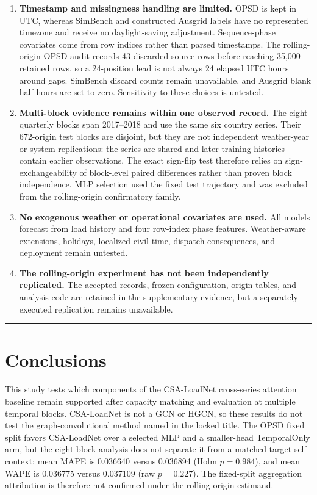 \documentclass[electronics,article,submit,moreauthors]{Definitions/mdpi}
\begin{document}
\begin{enumerate}
\item
  \textbf{Timestamp and missingness handling are limited.} OPSD is kept in UTC, whereas SimBench and constructed Ausgrid labels have no represented timezone and receive no daylight-saving adjustment. Sequence-phase covariates come from row indices rather than parsed timestamps. The rolling-origin OPSD audit records 43 discarded source rows before reaching 35,000 retained rows, so a 24-position lead is not always 24 elapsed UTC hours around gaps. SimBench discard counts remain unavailable, and Ausgrid blank half-hours are set to zero. Sensitivity to these choices is untested.
\item
  \textbf{Multi-block evidence remains within one observed record.} The eight quarterly blocks span 2017--2018 and use the same six country series. Their 672-origin test blocks are disjoint, but they are not independent weather-year or system replications: the series are shared and later training histories contain earlier observations. The exact sign-flip test therefore relies on sign-exchangeability of block-level paired differences rather than proven block independence. MLP selection used the fixed test trajectory and was excluded from the rolling-origin confirmatory family.
\item
  \textbf{No exogenous weather or operational covariates are used.} All models forecast from load history and four row-index phase features. Weather-aware extensions, holidays, localized civil time, dispatch consequences, and deployment remain untested.
\item
  \textbf{The rolling-origin experiment has not been independently replicated.} The accepted records, frozen configuration, origin tables, and analysis code are retained in the supplementary evidence, but a separately executed replication remains unavailable.
\end{enumerate}

\begin{center}\rule{0.5\linewidth}{0.5pt}\end{center}

\section{Conclusions}\label{conclusions}

This study tests which components of the CSA-LoadNet cross-series attention baseline remain supported after capacity matching and evaluation at multiple temporal blocks. CSA-LoadNet is not a GCN or HGCN, so these results do not test the graph-convolutional method named in the locked title. The OPSD fixed split favors CSA-LoadNet over a selected MLP and a smaller-head TemporalOnly arm, but the eight-block analysis does not separate it from a matched target-self context: mean MAPE is 0.036640 versus 0.036894 (Holm \(p=0.984\)), and mean WAPE is 0.036775 versus 0.037109 (raw \(p=0.227\)). The fixed-split aggregation attribution is therefore not confirmed under the rolling-origin estimand.
\end{document}
